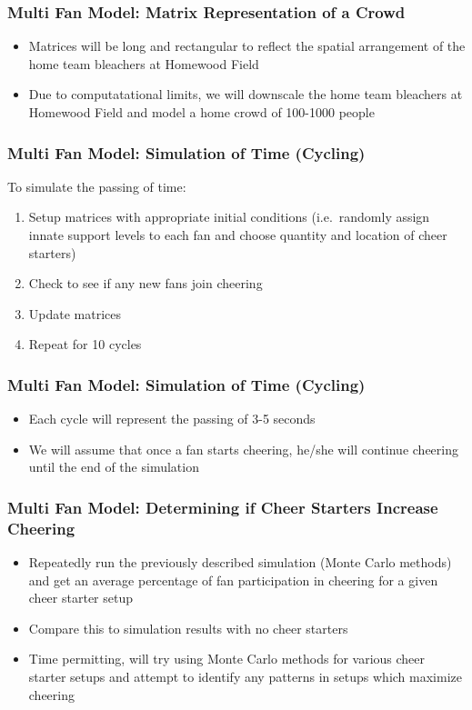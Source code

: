 \documentclass[compress,handout,10pt]{beamer}
\let\olditem\item
\renewcommand{\item}{\setlength{\itemsep}{0.5\baselineskip}\olditem}
\begin{document}
\begin{frame}
\frametitle {Multi Fan Model: Matrix Representation of a Crowd}
	\begin {itemize}
		\item Matrices will be long and rectangular to reflect the spatial arrangement of the home team bleachers at Homewood Field
		\item Due to computatational limits, we will downscale the home team bleachers at Homewood Field and model a home crowd of 100-1000 people
	\end{itemize}		
\end{frame}

\begin{frame}
\frametitle{Multi Fan Model: Simulation of Time (Cycling)}
To simulate the passing of time:
	\begin {enumerate}
		\item Setup matrices with appropriate initial conditions (i.e.~randomly assign innate support levels to each fan and choose quantity and location of cheer starters)
		\item Check to see if any new fans join cheering
		\item Update matrices
		\item Repeat for 10 cycles
	\end {enumerate}
\end{frame}

\begin{frame}
\frametitle{Multi Fan Model: Simulation of Time (Cycling)}
	\begin {itemize}
		\item Each cycle will represent the passing of 3-5 seconds
		\item We will assume that once a fan starts cheering, he/she will continue cheering until the end of the simulation
	\end{itemize}
\end{frame}	

\begin{frame}
\frametitle{Multi Fan Model: Determining if Cheer Starters Increase Cheering}
\begin{itemize}
	\item Repeatedly run the previously described simulation (Monte Carlo methods) and get an average percentage of fan participation in cheering for a given cheer starter setup
	\item Compare this to simulation results with no cheer starters
	\item Time permitting, will try using Monte Carlo methods for various cheer starter setups and attempt to identify any patterns in setups which maximize cheering 
\end{itemize}
\end{frame}
\end{document}
